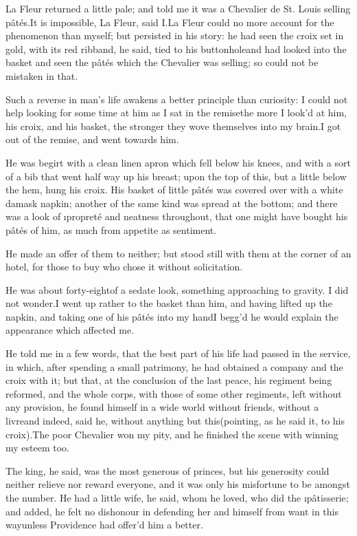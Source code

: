 \documentclass[twoside]{article}
\begin{document}
La Fleur returned a little pale; and told
me it was a Chevalier de St.  Louis
selling pâtés.\tskk It is impossible, La
Fleur, said I.\tskk La Fleur could no more
account for the phenomenon than myself;
but persisted in his story: he had seen
the croix set in gold, with its red
ribband, he said, tied to his
buttonhole\tskk and had looked into the
basket and seen the pâtés which the
Chevalier was selling; so could not be
mistaken in that.

Such a reverse in man’s life awakens a
better principle than curiosity: I could
not help looking for some time at him as I
sat in the remise\tskk the more I look’d
at him, his croix, and his basket, the
stronger they wove themselves into my
brain.\tskk I got out of the remise, and
went towards him.

He was begirt with a clean linen apron
which fell below his knees, and with a
sort of a bib that went half way up his
breast; upon the top of this, but a little
below the hem, hung his croix.  His basket
of little pâtés was covered over with a
white damask napkin; another of the same
kind was spread at the bottom; and there
was a look of \i{propreté} and neatness
throughout, that one might have bought his
pâtés of him, as much from appetite as
sentiment.

He made an offer of them to neither; but
stood still with them at the corner of an
hotel, for those to buy who chose it
without solicitation.

He was about forty-eight\tskk of a sedate
look, something approaching to gravity.  I
did not wonder.\tskk I went up rather to
the basket than him, and having lifted up
the napkin, and taking one of his pâtés
into my hand\tskk I begg’d he would
explain the appearance which affected me.

He told me in a few words, that the best
part of his life had passed in the
service, in which, after spending a small
patrimony, he had obtained a company and
the croix with it; but that, at the
conclusion of the last peace, his regiment
being reformed, and the whole corps, with
those of some other regiments, left
without any provision, he found himself in
a wide world without friends, without a
livre\tskk and indeed, said he, without
anything but this\tskk (pointing, as he
said it, to his croix).\tskk The poor
Chevalier won my pity, and he finished the
scene with winning my esteem too.

The king, he said, was the most generous
of princes, but his generosity could
neither relieve nor reward everyone, and
it was only his misfortune to be amongst
the number.  He had a little wife, he
said, whom he loved, who did the
\i{pâtisserie}; and added, he felt no
dishonour in defending her and himself
from want in this way\tskk unless
Providence had offer’d him a better.
\end{document}
